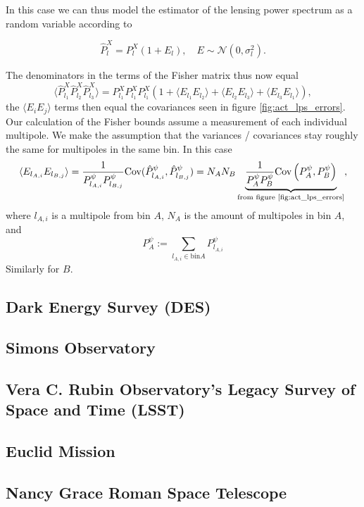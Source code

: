 \documentclass[11pt]{article} %
\DeclareRobustCommand{\Cov}{\ifmmode\text{Cov}\else d\fi}
\newcommand{\br}[1]{\ensuremath{\left( #1 \right)}}
\begin{document}
In this case we can thus model the estimator of the lensing power spectrum as a random variable according to

\begin{equation*}
	\hat P^X_l = P^X_l(1+E_l), \quad E \sim \mathcal N(0, \sigma^2_l).
\end{equation*}

The denominators in the terms of the Fisher matrix thus now equal
\begin{equation*}
	\langle \hat P^X_{l_1} \hat P^X_{l_2} \hat P^X_{l_3} \rangle =P^X_{l_1}P^X_{l_1}P^X_{l_1} (1 + \langle E_{l_1}E_{l_2}\rangle + \langle E_{l_2}E_{l_3}\rangle + \langle E_{l_3}E_{l_1}\rangle),
\end{equation*}
the $\langle E_i E_j \rangle$ terms then equal the covariances seen in figure \ref{fig:act_lps_errors}. Our calculation of the Fisher bounds assume a measurement of each individual multipole. We make the assumption that the variances / covariances stay roughly the same for multipoles in the same bin. In this case
\begin{equation*}
	\langle E_{l_{A,i}}E_{l_{B,j}} \rangle = \frac{1}{P^\psi_{l_{A,i}}P^\psi_{l_{B,j}}}\Cov (\hat P^\psi_{l_{A,i}},\hat P^\psi_{l_{B,j}}) = N_AN_B \underbrace{ \frac{1}{P^\psi_AP^\psi_B}\Cov\br{ P^\psi_A , P_B^\psi }}_{\text{from figure \ref{fig:act_lps_errors}}},
\end{equation*}
where $l_{A,i}$ is a multipole from bin $A$, $N_A$ is the amount of multipoles in bin $A$, and
$$
P^\psi_A:=\sum_{l_{A,i}\in \text{bin} A}P^\psi_{l_{A,i}}
$$
Similarly for $B$.






\subsection{Dark Energy Survey (DES)}
\subsection{Simons Observatory}
\subsection{Vera C. Rubin Observatory's Legacy Survey of Space and Time (LSST)}
\subsection{Euclid Mission}
\subsection{Nancy Grace Roman Space Telescope}
\end{document}
